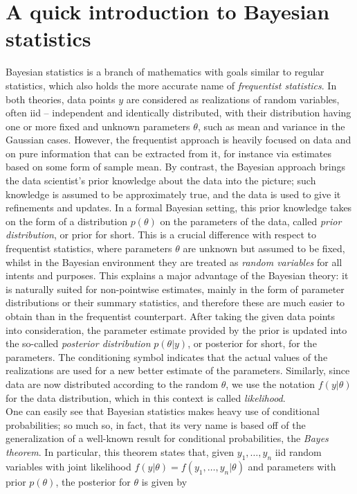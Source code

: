 \section{A quick introduction to Bayesian statistics}
Bayesian statistics is a branch of mathematics with goals similar to regular statistics, which also holds the more accurate name of \emph{frequentist statistics}.
In both theories, data points $y$ are considered as realizations of random variables, often iid -- independent and identically distributed, with their distribution having one or more fixed and unknown parameters $\theta$, such as mean and variance in the Gaussian cases.
However, the frequentist approach is heavily focused on data and on pure information that can be extracted from it, for instance via estimates based on some form of sample mean.
By contrast, the Bayesian approach brings the data scientist's prior knowledge about the data into the picture; such knowledge is assumed to be approximately true, and the data is used to give it refinements and updates.
In a formal Bayesian setting, this prior knowledge takes on the form of a distribution $p(\theta)$ on the parameters of the data, called \emph{prior distribution}, or prior for short.
This is a crucial difference with respect to frequentist statistics, where parameters $\theta$ are unknown but assumed to be fixed, whilst in the Bayesian environment they are treated as \emph{random variables} for all intents and purposes.
This explains a major advantage of the Bayesian theory: it is naturally suited for non-pointwise estimates, mainly in the form of parameter distributions or their summary statistics, and therefore these are much easier to obtain than in the frequentist counterpart.
After taking the given data points into consideration, the parameter estimate provided by the prior is updated into the so-called \emph{posterior distribution} $p(\theta|y)$, or posterior for short, for the parameters.
The conditioning symbol indicates that the actual values of the realizations are used for a new better estimate of the parameters.
Similarly, since data are now distributed according to the random $\theta$, we use the notation $f(y|\theta)$ for the data distribution, which in this context is called \emph{likelihood}. \\
One can easily see that Bayesian statistics makes heavy use of conditional probabilities; so much so, in fact, that its very name is based off of the generalization of a well-known result for conditional probabilities, the \emph{Bayes theorem}.
In particular, this theorem states that, given $y_1, \dots, y_n$ iid random variables with joint likelihood $f(y|\theta) = f(y_1, \dots, y_n | \theta)$ and parameters with prior $p(\theta)$, the posterior for $\theta$ is given by
